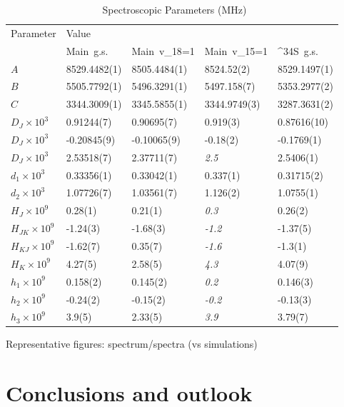 \documentclass[a4paper]{article}
\begin{document}
\begin{table*}
\small
  \caption{\ Spectroscopic Parameters (MHz)}
  \label{tbl:parameters}
\begin{tabular*}{1\textwidth}{@{\extracolsep{\fill}}lllll}
\hline
Parameter & Value \\
 & Main~g.s. & Main~v_{18}=1 & Main~v_{15}=1 & ^{34}S~g.s. \\
\hline
$A$ & 8529.4482(1) & 8505.4484(1) & 8524.52(2) & 8529.1497(1) &  \\
$B$ & 5505.7792(1) & 5496.3291(1) & 5497.158(7) & 5353.2977(2) &  \\
$C$ & 3344.3009(1) & 3345.5855(1) & 3344.9749(3) & 3287.3631(2) &  \\
$D_J \times 10 ^ {3}$ & 0.91244(7) & 0.90695(7) & 0.919(3) & 0.87616(10) &  \\
$D_J \times 10 ^ {3}$ & -0.20845(9) & -0.10065(9) & -0.18(2) & -0.1769(1) &  \\
$D_J \times 10 ^ {3}$ & 2.53518(7) & 2.37711(7) & \emph{2.5} & 2.5406(1) &  \\
$d_1 \times 10 ^ {3}$ & 0.33356(1) & 0.33042(1) & 0.337(1) & 0.31715(2) &  \\
$d_2 \times 10 ^ {3}$ & 1.07726(7) & 1.03561(7) & 1.126(2) & 1.0755(1) &  \\
$H_{J} \times 10 ^ {9}$ & 0.28(1) & 0.21(1) & \emph{0.3} & 0.26(2) &  \\
$H_{JK} \times 10 ^ {9}$ & -1.24(3) & -1.68(3) & \emph{-1.2} & -1.37(5) &  \\
$H_{KJ} \times 10 ^ {9}$ & -1.62(7) & 0.35(7) & \emph{-1.6} & -1.3(1) &  \\
$H_{K} \times 10 ^ {9}$ & 4.27(5) & 2.58(5) & \emph{4.3} & 4.07(9) &  \\
$h_1 \times 10 ^ {9}$ & 0.158(2) & 0.145(2) & \emph{0.2} & 0.146(3) &  \\
$h_2 \times 10 ^ {9}$ & -0.24(2) & -0.15(2) & \emph{-0.2} & -0.13(3) &  \\
$h_3 \times 10 ^ {9}$ & 3.9(5) & 2.33(5) & \emph{3.9} & 3.79(7) &  \\
\hline
\end{tabular*}
\end{table*}

Representative figures: spectrum/spectra (vs simulations)

\section{Conclusions and outlook}
\end{document}
